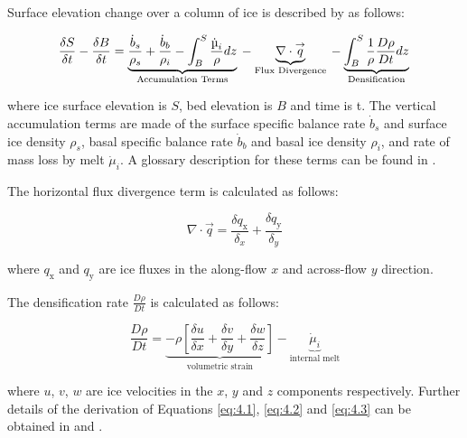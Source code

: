 Surface elevation change over a column of ice is described by \citet[][,p.335]{Cuffeyphysicsglaciers2010} as follows:

\begin{equation}
  \frac{\delta S}{\delta t}-\frac{\delta B}{\delta t} \\
  = \underbrace{ \frac{\dot{b}_s}{\rho_s} + \frac{\dot{b}_b}{\rho_i} - \int_{B}^{S}\frac{\dot{\mu}_i}{\rho} dz }_{\text{Accumulation Terms}} \\
  - \underbrace{\nabla\cdot \overset{\rightarrow}{q}}_{\text{Flux Divergence}} \\
  - \underbrace{\int_{B}^{S} \frac{1}{\rho}\frac{D\rho}{Dt}dz }_{\text{Densification}} \\
  \label{eq:4.1}
\end{equation}

where ice surface elevation is $S$, bed elevation is $B$ and time is \gls{t}.
The vertical accumulation terms are made of the surface specific balance rate $\dot{b}_s$ and surface ice density $\rho_s$, basal specific balance rate $\dot{b}_b$ and basal ice density $\rho_i$, and rate of mass loss by melt $\dot{\mu}_i$.
A glossary description for these terms can be found in \citet{CogleyGlossaryglaciermass2011}.

The horizontal flux divergence term is calculated as follows:

\begin{equation}
  \nabla\cdot \overset{\rightarrow}{q} = \frac{\delta q_\text{x}}{\delta_x} + \frac{\delta q_\text{y}}{\delta_y} \label{eq:4.2}
\end{equation}

where $q_\text{x}$ and $q_\text{y}$ are ice fluxes in the along-flow $x$ and across-flow $y$ direction.

The densification rate $\frac{D\rho}{Dt}$ is calculated as follows:

\begin{equation}
  \frac{D\rho}{Dt} = \underbrace{-\rho \left[ \frac{\delta u}{\delta x} + \frac{\delta v}{\delta y} + \frac{\delta w}{\delta z} \right]}_{\text{volumetric strain}} - \underbrace{\dot{\mu}_i}_{\text{internal melt}} \label{eq:4.3}
\end{equation}

where $u$, $v$, $w$ are ice velocities in the $x$, $y$ and $z$ components respectively.
Further details of the derivation of Equations \eqref{eq:4.1}, \eqref{eq:4.2} and \eqref{eq:4.3} can be obtained in \citet{WhillansEquationContinuityits1977} and \citet{ReehCombiningSARinterferometry1999}.

